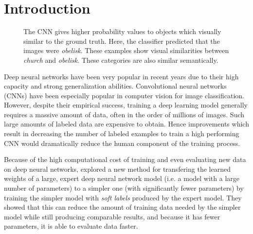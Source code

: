 \section{Introduction}


\begin{figure}[t]
  \centering



  \caption{
    The CNN gives higher probability values to objects which visually similar to
    the ground truth. Here, the classifier predicted that the images were
    \emph{obelisk}. These examples show visual similarities between
    \emph{church} and \emph{obelisk}. These categories are also similar
    semantically.
  }
  \label{fig:vgg16arch}
\end{figure}


Deep neural networks have been very popular in recent years due to their high
capacity and strong generalization abilities.  Convolutional neural networks
(CNNs) have been especially popular in computer vision for image classification.
However, despite their empirical success, training a deep learning model
generally requires a massive amount of data, often in the order of millions of
images. Such large amounts of labeled data are expensive to obtain. Hence 
improvements which result in decreasing the number of labeled examples to train
a high performing CNN would dramatically reduce the human component of the
training process.

Because of the high computational cost of training and even evaluating new data
on deep neural networks, \cite{hinton2015distilling} explored a new method
for transfering the learned weights of a large, expert deep neural network model
(i.e. a model with a large number of parameters) to a simpler one (with
significantly fewer parameters) by training the simpler model with \emph{soft
labels} produced by the expert model. They showed that this can reduce the
amount of training data needed by the simpler model while still producing
comparable results, and because it has fewer parameters, it is able to evaluate
data faster.

